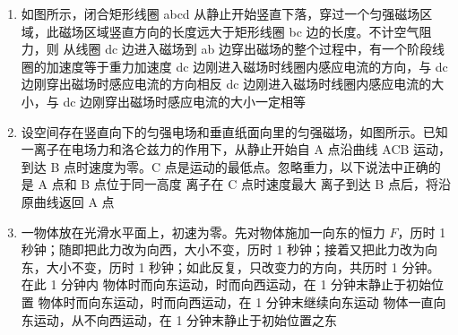 \documentclass[\gkver]{gaokaozhenti}
\begin{document}
\begin{enumerate}
\item
如图所示，闭合矩形线圈 abcd 从静止开始竖直下落，穿过一个匀强磁场区域，此磁场区域竖直方向的长度远大于矩形线圈 bc 边的长度。不计空气阻力，则
\onepicture{}
{从线圈 dc 边进入磁场到 ab 边穿出磁场的整个过程中，有一个阶段线圈的加速度等于重力加速度}
{dc 边刚进入磁场时线圈内感应电流的方向，与 dc 边刚穿出磁场时感应电流的方向相反}
{dc 边刚进入磁场时线圈内感应电流的大小，与 dc 边刚穿出磁场时感应电流的大小一定相等}


\item
设空间存在竖直向下的匀强电场和垂直纸面向里的匀强磁场，如图所示。已知一离子在电场力和洛仑兹力的作用下，从静止开始自 A 点沿曲线 ACB 运动，到达 B 点时速度为零。C 点是运动的最低点。忽略重力，以下说法中正确的是
{A 点和 B 点位于同一高度}
{离子在 C 点时速度最大}
{离子到达 B 点后，将沿原曲线返回 A 点}


\item
一物体放在光滑水平面上，初速为零。先对物体施加一向东的恒力 $F$，历时 1 秒钟；随即把此力改为向西，大小不变，历时 1 秒钟；接着又把此力改为向东，大小不变，历时 1 秒钟；如此反复，只改变力的方向，共历时 1 分钟。在此 1 分钟内
{物体时而向东运动，时而向西运动，在 1 分钟末静止于初始位置}
{物体时而向东运动，时而向西运动，在 1 分钟末继续向东运动}
{物体一直向东运动，从不向西运动，在 1 分钟末静止于初始位置之东}


\end{enumerate}
\end{document}
